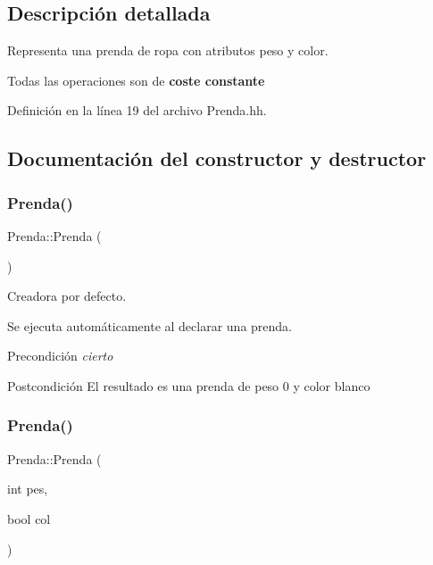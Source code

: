 \subsection{Descripción detallada}
Representa una prenda de ropa con atributos peso y color. 

Todas las operaciones son de {\bfseries coste constante} 

Definición en la línea 19 del archivo Prenda.\+hh.



\subsection{Documentación del constructor y destructor}
\mbox{\label{class_prenda_adfd86b131c7f40c58b0cb4200eb55129}} 
\subsubsection{\texorpdfstring{Prenda()}{Prenda()}\hspace{0.1cm}{\footnotesize\ttfamily [1/2]}}
{\footnotesize\ttfamily Prenda\+::\+Prenda (\begin{DoxyParamCaption}{ }\end{DoxyParamCaption})}



Creadora por defecto. 

Se ejecuta automáticamente al declarar una prenda. \begin{DoxyPrecond}{Precondición}
{\itshape cierto} 
\end{DoxyPrecond}
\begin{DoxyPostcond}{Postcondición}
El resultado es una prenda de peso 0 y color blanco 
\end{DoxyPostcond}
\mbox{\label{class_prenda_af15ff723083040b89bc495b4ec4b914e}} 
\subsubsection{\texorpdfstring{Prenda()}{Prenda()}\hspace{0.1cm}{\footnotesize\ttfamily [2/2]}}
{\footnotesize\ttfamily Prenda\+::\+Prenda (\begin{DoxyParamCaption}\item[{int}]{pes,  }\item[{bool}]{col }\end{DoxyParamCaption})}



